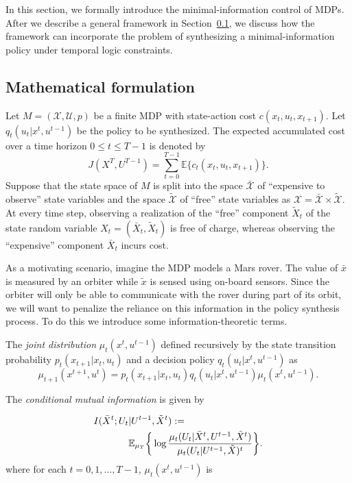 In this section, we formally introduce the minimal-information control of MDPs.
After we describe a general framework in Section~\ref{secformulation}, we discuss how the framework can incorporate the problem of synthesizing a minimal-information policy under temporal logic constraints.

\subsection{Mathematical formulation}
\label{secformulation}

Let $M=(\mathcal{X}, \mathcal{U}, p)$ be a finite MDP with state-action cost $c(x_t, u_t, x_{t+1})$. Let $q_t(u_t|x^t,u^{t-1})$ be the policy to be synthesized. The expected accumulated cost over a time horizon $0\leq t \leq T-1$ is denoted by
\[
J(X^T, U^{T-1})=\sum_{t=0}^{T-1}\mathbb{E}\{c_t(x_t, u_t, x_{t+1})\}.
\]
Suppose that the state space of $M$ is split into the space $\bar{\mathcal{X}}$ of ``expensive to observe'' state variables and the space $\tilde{\mathcal{X}}$ of ``free'' state variables as $\mathcal{X}=\bar{\mathcal{X}}\times \tilde{\mathcal{X}}$.
At every time step, observing a realization of the ``free'' component $\tilde{X}_t$ of the state random variable $X_t=(\bar{X}_t, \tilde{X}_t)$ is free of charge, whereas observing the ``expensive'' component $\bar{X}_t$ incurs cost. 

As a motivating scenario, imagine the MDP models a Mars rover. The value of $\bar{x}$ is measured by an orbiter while $\tilde{x}$ is sensed using on-board sensors. Since the orbiter will only be able to communicate with the rover during part of its orbit, we will want to penalize the reliance on this information in the policy synthesis process. To do this we introduce some information-theoretic terms. 

The \emph{joint distribution} $\mu_{t}(x^{t}, u^{t-1})$ defined recursively by the state transition probability $p_t(x_{t+1}|x_t, u_t)$ and a decision policy $q_t(u_t|x^t, u^{t-1})$ as
\[
\mu_{t+1}(x^{t+1}, u^t)=p_t(x_{t+1}|x_t, u_t)q_t(u_t|x^t, u^{t-1})\mu_t(x^t, u^{t-1}).
\]


 The \emph{conditional mutual information} is given by 

\begin{align*}
I  (\bar{X}^t;U_t & \vert U^{t-1},\tilde{X}^{t}) := \nonumber \\ &\mathbb{E}_{\mu_T}\bigg\{\log\frac{\mu_{t}(U_t|\bar{X}^{t},U^{t-1},\tilde{X}^t)}{\mu_{t}(U_t\vert U^{t-1}, \tilde{X})^t}\bigg\}.
\end{align*}
where for each $t=0,1, ..., T-1$, $\mu_t(x^t, u^{t-1})$ is 

